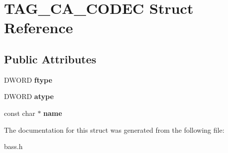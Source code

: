 \section{T\+A\+G\+\_\+\+C\+A\+\_\+\+C\+O\+D\+E\+C Struct Reference}
\label{struct_t_a_g___c_a___c_o_d_e_c}
\subsection*{Public Attributes}
\begin{DoxyCompactItemize}
\item 
D\+W\+O\+R\+D {\bfseries ftype}\label{struct_t_a_g___c_a___c_o_d_e_c_af43a0d3c8d295bc3a37ae9245a47619b}

\item 
D\+W\+O\+R\+D {\bfseries atype}\label{struct_t_a_g___c_a___c_o_d_e_c_a9f3c5b7726d72f1174290dfca6793bc1}

\item 
const char $\ast$ {\bfseries name}\label{struct_t_a_g___c_a___c_o_d_e_c_a513a8849b3b4850ff4f1b0e14fe2146c}

\end{DoxyCompactItemize}


The documentation for this struct was generated from the following file\+:\begin{DoxyCompactItemize}
\item 
bass.\+h\end{DoxyCompactItemize}
